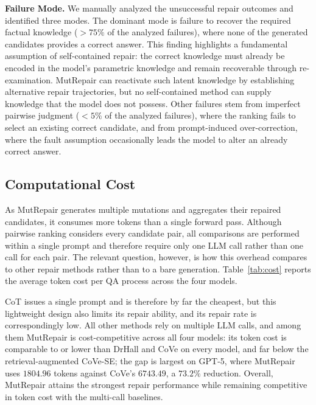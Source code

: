 \documentclass[acmsmall,screen,review,anonymous]{acmart}
\begin{document}
\noindent\textbf{Failure Mode.} We manually analyzed the unsuccessful repair outcomes and identified three modes. The dominant mode is failure to recover the required factual knowledge ($>75\%$ of the analyzed failures), where none of the generated candidates provides a correct answer. This finding highlights a fundamental assumption of self-contained repair: the correct knowledge must already be encoded in the model's parametric knowledge and remain recoverable through re-examination. MutRepair can reactivate such latent knowledge by establishing alternative repair trajectories, but no self-contained method can supply knowledge that the model does not possess. Other failures stem from imperfect pairwise judgment ($<5\%$ of the analyzed failures), where the ranking fails to select an existing correct candidate, and from prompt-induced over-correction, where the fault assumption occasionally leads the model to alter an already correct answer.


\subsection{Computational Cost}\label{sec:6.2}

As MutRepair generates multiple mutations and aggregates their repaired candidates, it consumes more tokens than a single forward pass. Although pairwise ranking considers every candidate pair, all comparisons are performed within a single prompt and therefore require only one LLM call rather than one call for each pair. The relevant question, however, is how this overhead compares to other repair methods rather than to a bare generation. Table~\ref{tab:cost} reports the average token cost per QA process across the four models.

CoT issues a single prompt and is therefore by far the cheapest, but this lightweight design also limits its repair ability, and its repair rate is correspondingly low. All other methods rely on multiple LLM calls, and among them MutRepair is cost-competitive across all four models: its token cost is comparable to or lower than DrHall and CoVe on every model, and far below the retrieval-augmented CoVe-SE; the gap is largest on GPT-5, where MutRepair uses $1804.96$ tokens against CoVe's $6743.49$, a $73.2\%$ reduction. Overall, MutRepair attains the strongest repair performance while remaining competitive in token cost with the multi-call baselines.
\end{document}
